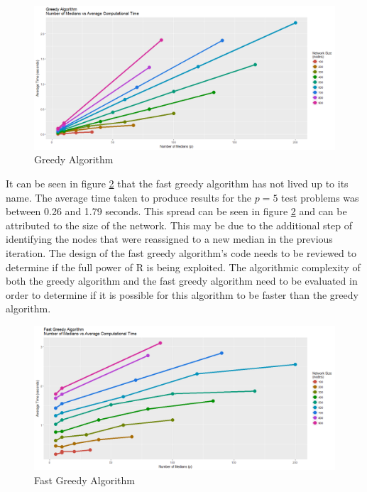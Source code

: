 \documentclass[11pt]{article}
\begin{document}
	\begin{figure}[H]
		\begin{center}
			\includegraphics[width=15cm]{Greedy.png}
			\caption{Greedy Algorithm}
			\label{greedymediantime}
		\end{center}
	\end{figure}
	
	It can be seen in figure \ref{fastgreedymediantime} that the fast greedy algorithm has not lived up to its name.  The average time taken to produce results for the $p=5$ test problems was between 0.26 and 1.79 seconds.  This spread can be seen in figure \ref{fastgreedymediantime} and can be attributed to the size of the network.  This may be due to the additional step of identifying the nodes that were reassigned to a new median in the previous iteration.  The design of the fast greedy algorithm's code needs to be reviewed to determine if the full power of R is being exploited.  The algorithmic complexity of both the greedy algorithm and the fast greedy algorithm  need to be evaluated in order to determine if it is possible for this algorithm to be faster than the greedy algorithm. 

	\begin{figure}[H]
		\begin{center}
		\includegraphics[width=15cm]{FastGreedy.png}
			\caption{Fast Greedy Algorithm}
			\label{fastgreedymediantime}
		\end{center}
	\end{figure}
\end{document}
